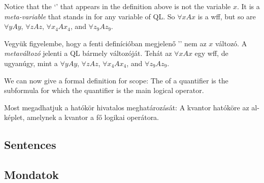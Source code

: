 Notice that the `' that appears in the definition above is not the variable $x$. It is a \emph{meta-variable} that stands in for any variable of QL. So $\forall xAx$ is a wff, but so are $\forall yAy$, $\forall zAz$, $\forall x_4Ax_4$, and $\forall z_9Az_9$.

Vegyük figyelembe, hogy a fenti definícióban megjelenő '' nem az $x$ változó. A \emph{metaváltozó} jelenti a QL bármely változóját. Tehát az $\forall xAx$ egy wff, de ugyanúgy, mint a $\forall yAy$, $\forall zAz$, $\forall x_4Ax_4$, and $\forall z_9Az_9$.

We can now give a formal definition for scope: The  of a quantifier is the subformula for which the quantifier is the main logical operator. 

Most megadhatjuk a hatókör hivatalos meghatározását: A kvantor hatóköre az al-képlet, amelynek a kvantor a fő logikai operátora.








\subsection*{Sentences}
\subsection{Mondatok}

